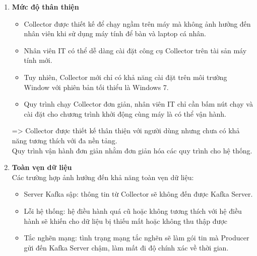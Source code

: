 \begin{enumerate}
\begin{itemize}[label=--]
        \item Sử dụng tài nguyên hệ thống:\\
        Nhóm tiến hành đo dựa trên mức sử dụng CPU và RAM của tiến trình thực thi quét. Kết quả sau 10 lần chạy cho thấy:
        \begin{itemize}[label=\textbullet]
            \item RAM dao động từ 33MB đến 34MB là rất nhỏ và cho thấy công cụ Scanner sử dụng tài nguyên bộ nhớ một cách hiệu quả. Biên độ dao động 1MB cho thấy sự ổn định trong việc quản lý bộ nhớ, không có dấu hiệu rò rỉ bộ nhớ (memory leak).
            \item CPU dao động từ 0.00\% đến 0.1\%. Điều này thể hiện rằng công cụ Collector không chiếm dụng tài nguyên CPU đáng kể trong quá trình quét.
        \end{itemize}
    \end{itemize}
    \item \textbf{Mức độ thân thiện}
    \begin{itemize}[label=--]
        \item Collector được thiết kế để chạy ngầm trên máy mà không ảnh hưởng đến nhân viên khi sử dụng máy tính để bàn và laptop cá nhân.  
        \item Nhân viên IT có thể dễ dàng cài đặt công cụ Collector trên tài sản máy tính mới.
        \item Tuy nhiên, Collector mới chỉ có khả năng cài đặt trên môi trường Window với phiên bản tối thiểu là Windows 7.
        \item Quy trình chạy Collector đơn giản, nhân viên IT chỉ cần bấm nút chạy và cài đặt cho chương trình khởi động cùng máy là có thể vận hành.
    \end{itemize}
    => Collector được thiết kế thân thiện với người dùng nhưng chưa có khả năng tương thích với đa nền tảng. 
    \\ Quy trình vận hành đơn giản nhằm đơn giản hóa các quy trình cho hệ thống. 
    \item \textbf{Toàn vẹn dữ liệu}\\
     Các trường hợp ảnh hưởng đến khả năng toàn vẹn dữ liệu:
        \begin{itemize}[label=--]
            \item Server Kafka sập: thông tin từ Collector sẽ không đến được Kafka Server.
            \item Lỗi hệ thống: hệ điều hành quá cũ hoặc không tương thích với hệ điều hành sẽ khiến cho dữ liệu bị thiếu mất hoặc không thu thập được
            \item Tắc nghẽn mạng: tình trạng mạng tắc nghẽn sẽ làm gói tin mà Producer gửi đến Kafka Server chậm, làm mất đi độ chính xác về thời gian.
        \end{itemize}
\end{enumerate}

